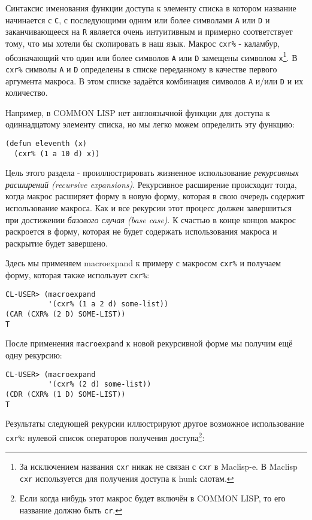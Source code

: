 Синтаксис именования функции доступа к элементу списка в котором название начинается с \verb"C", с последующими одним или более символами \verb"A" или \verb"D" и заканчивающееся на \verb"R" является очень интуитивным и примерно соответствует тому, что мы хотели бы скопировать в наш язык. Макрос \verb"cxr%" - каламбур, обозначающий что один или более символов \verb"A" или \verb"D" замещены символом \verb"x"\footnote{За исключением названия \verb"cxr" никак не связан с \verb"cxr" в Maclisp-e. В Maclisp \verb"cxr" используется для получения доступа к hunk слотам.}. В \verb"cxr%" символы \verb"A" и \verb"D" определены в списке переданному в качестве первого аргумента макроса. В этом списке задаётся комбинация символов \verb"A" и/или \verb"D" и их количество.



Например, в COMMON LISP нет англоязычной функции для доступа к одиннадцатому элементу списка, но мы легко можем определить эту функцию:

\begin{verbatim}
(defun eleventh (x)
  (cxr% (1 a 10 d) x))
\end{verbatim}

Цель этого раздела - проиллюстрировать жизненное использование \emph{рекурсивных расширений (recursive expansions)}. Рекурсивное расширение происходит тогда, когда макрос расширяет форму в новую форму, которая в свою очередь содержит использование макроса. Как и все рекурсии этот процесс должен завершиться при достижении \emph{базового случая (base case)}. К счастью в конце концов макрос раскроется в форму, которая не будет содержать использования макроса и раскрытие будет завершено.

Здесь мы применяем macroexpand к примеру с макросом \verb"cxr%" и получаем форму, которая также использует \verb"cxr%":

\begin{verbatim}
CL-USER> (macroexpand
          '(cxr% (1 a 2 d) some-list))
(CAR (CXR% (2 D) SOME-LIST))
T
\end{verbatim}

После применения \verb"macroexpand" к новой рекурсивной форме мы получим ещё одну рекурсию:

\begin{verbatim}
CL-USER> (macroexpand
          '(cxr% (2 d) some-list))
(CDR (CXR% (1 D) SOME-LIST))
T
\end{verbatim}

Результаты следующей рекурсии иллюстрируют другое возможное использование \verb"cxr%": нулевой список операторов получения доступа\footnote{Если когда нибудь этот макрос будет включён в COMMON LISP, то его название должно быть \verb"cr".}:



